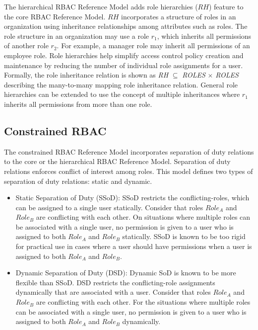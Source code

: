 The hierarchical RBAC Reference Model adds role hierarchies ($RH$) feature to the core RBAC Reference Model.
$RH$ incorporates a structure of roles in an organization using inheritance relationships among attributes such as roles.
The role structure in an organization may use
a role $r_1$, which inherits all permissions of another role $r_2$.
For example, a manager role may inherit all permissions of an employee role.
Role hierarchies help simplify access control policy creation and maintenance by reducing the number of
individual role assignments for a user. Formally, the role inheritance relation is shown as \textit{RH} $\subseteq$ \textit{ROLES} $\times$ \textit{ROLES} describing the many-to-many mapping role inheritance relation. 
General role hierarchies can be extended to use the concept of multiple inheritances where
$r_1$ inherits all permissions from more than one role.


\subsection{Constrained RBAC}

The constrained RBAC Reference Model incorporates separation of duty relations to  the core or the hierarchical RBAC Reference Model. Separation of 
duty relations enforces conflict of interest among roles. This model defines two types of separation of duty relations: static and dynamic.

\begin{itemize}
	\item Static Separation of Duty (SSoD): SSoD restricts the conflicting-roles, which can be assigned to a single user statically. Consider that roles $Role_A$ and $Role_B$ are conflicting with each other. On situations
	where multiple roles can be associated with a single user, no permission is given to a user who is assigned to both $Role_A$ and $Role_B$ statically. SSoD is known to be too rigid for practical use in cases where a user should have permissions when a user is assigned to both $Role_A$ and $Role_B$.
	\item Dynamic Separation of Duty (DSD): Dynamic SoD is known to be
more flexible than SSoD. DSD restricts the conflicting-role assignments dynamically that are associated with a user. Consider that roles $Role_A$ and $Role_B$ are conflicting with each other. For the situations where multiple roles can be associated with a single user, no permission is given to a user who is assigned to both $Role_A$ and $Role_B$ dynamically.	
\end{itemize}
